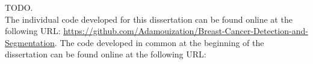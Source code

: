 TODO.\\

The individual code developed for this dissertation can be found online at the following URL: \url{https://github.com/Adamouization/Breast-Cancer-Detection-and-Segmentation}. The code developed in common at the beginning of the dissertation can be found online at the following URL: \url{}